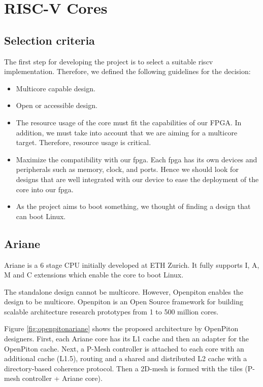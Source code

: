 \section{RISC-V Cores}

\subsection{Selection criteria}
The first step for developing the project is to select a suitable riscv implementation. Therefore, we defined the following guidelines for the decision:
\begin{itemize}
\item Multicore capable design.
\item Open or accessible design.
\item The resource usage of the core must fit the capabilities of our FPGA. In addition, we must take into account that we are aiming for a multicore target. Therefore, resource usage is critical.
\item Maximize the compatibility with our \gls{fpga}. Each \gls{fpga} has its own devices and peripherals such as memory, clock, and ports. Hence we should look for designs that are well integrated with our device to ease the deployment of the core into our \gls{fpga}.
\item As the project aims to boot something, we thought of finding a design that can boot Linux.
\end{itemize}

\subsection{Ariane}
Ariane is a 6 stage CPU initially developed at ETH Zurich. It fully supports I, A, M and C extensions which enable the core to boot Linux.

The standalone design cannot be multicore. However, Openpiton enables the design to be multicore. Openpiton\cite{openpiton} is an Open Source framework for building scalable architecture research prototypes from 1 to 500 million cores.

Figure \ref{fig:openpitonariane} shows the proposed architecture by OpenPiton designers. First, each Ariane core has its L1 cache and then an adapter for the OpenPiton cache. Next, a P-Mesh controller is attached to each core with an additional cache (L1.5), routing and a shared and distributed L2 cache with a directory-based coherence protocol. Then a 2D-mesh is formed with the tiles (P-mesh controller + Ariane core). 

